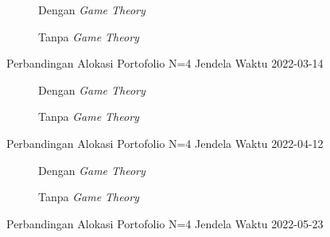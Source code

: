 \begin{figure}[!htbp]
    \centering
    \begin{subfigure}[b]{0.48\textwidth}
        \centering
        


        \caption{Dengan \textit{Game Theory}}
    \end{subfigure}
    \hfill
    \begin{subfigure}[b]{0.48\textwidth}
        \centering
        


        \caption{Tanpa \textit{Game Theory}}
    \end{subfigure}
    \caption{Perbandingan Alokasi Portofolio N=4 Jendela Waktu 2022-03-14}
    \label{fig:window_n4_2022_03_14}
\end{figure}

\begin{figure}[!htbp]
    \centering
    \begin{subfigure}[b]{0.48\textwidth}
        \centering
        


        \caption{Dengan \textit{Game Theory}}
    \end{subfigure}
    \hfill
    \begin{subfigure}[b]{0.48\textwidth}
        \centering
        


        \caption{Tanpa \textit{Game Theory}}
    \end{subfigure}
    \caption{Perbandingan Alokasi Portofolio N=4 Jendela Waktu 2022-04-12}
    \label{fig:window_n4_2022_04_12}
\end{figure}

\begin{figure}[!htbp]
    \centering
    \begin{subfigure}[b]{0.48\textwidth}
        \centering
        


        \caption{Dengan \textit{Game Theory}}
    \end{subfigure}
    \hfill
    \begin{subfigure}[b]{0.48\textwidth}
        \centering
        


        \caption{Tanpa \textit{Game Theory}}
    \end{subfigure}
    \caption{Perbandingan Alokasi Portofolio N=4 Jendela Waktu 2022-05-23}
    \label{fig:window_n4_2022_05_23}
\end{figure}

